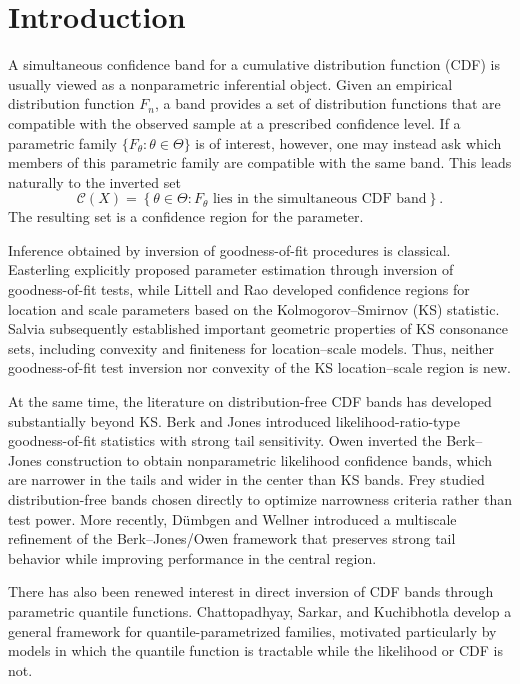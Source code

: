 \documentclass[11pt]{article}
\newcommand{\cC}{\mathcal{C}}
\begin{document}
\section{Introduction}

A simultaneous confidence band for a cumulative distribution function
(CDF) is usually viewed as a nonparametric inferential object.  Given an
empirical distribution function $F_n$, a band provides a set of
distribution functions that are compatible with the observed sample at
a prescribed confidence level.  If a parametric family
$\{F_\theta:\theta\in\Theta\}$ is of interest, however, one may instead
ask which members of this parametric family are compatible with the
same band.  This leads naturally to the inverted set
\[
    \cC(X)
    =
    \left\{
        \theta\in\Theta:
        F_\theta \text{ lies in the simultaneous CDF band}
    \right\}.
\]
The resulting set is a confidence region for the parameter.

Inference obtained by inversion of goodness-of-fit procedures is
classical.  Easterling \cite{Easterling1976} explicitly proposed
parameter estimation through inversion of goodness-of-fit tests, while
Littell and Rao \cite{LittellRao1978} developed confidence regions for
location and scale parameters based on the Kolmogorov--Smirnov (KS)
statistic.  Salvia \cite{Salvia1980} subsequently established important
geometric properties of KS consonance sets, including convexity and
finiteness for location--scale models.  Thus, neither goodness-of-fit
test inversion nor convexity of the KS location--scale region is new.

At the same time, the literature on distribution-free CDF bands has
developed substantially beyond KS.  Berk and Jones
\cite{BerkJones1979} introduced likelihood-ratio-type goodness-of-fit
statistics with strong tail sensitivity.  Owen \cite{Owen1995} inverted
the Berk--Jones construction to obtain nonparametric likelihood
confidence bands, which are narrower in the tails and wider in the
center than KS bands.  Frey \cite{Frey2008} studied distribution-free
bands chosen directly to optimize narrowness criteria rather than test
power.  More recently, Dümbgen and Wellner \cite{DumbgenWellner2023}
introduced a multiscale refinement of the Berk--Jones/Owen framework
that preserves strong tail behavior while improving performance in the
central region.

There has also been renewed interest in direct inversion of CDF bands
through parametric quantile functions.  Chattopadhyay, Sarkar, and
Kuchibhotla \cite{Chattopadhyay2026} develop a general framework for
quantile-parametrized families, motivated particularly by models in
which the quantile function is tractable while the likelihood or CDF is
not.
\end{document}
